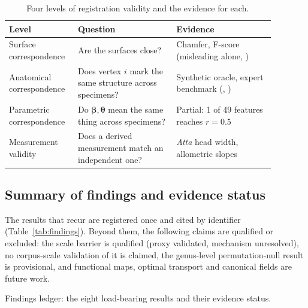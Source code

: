 \begin{table}[!htb]
\centering
\caption{Four levels of registration validity and the evidence for each.}
\label{tab:validity}
\begin{tabular}{@{}L{0.20\linewidth}L{0.34\linewidth}L{0.34\linewidth}@{}}
\toprule
\textbf{Level} & \textbf{Question} & \textbf{Evidence}\\
\midrule
Surface correspondence & Are the surfaces close? & Chamfer, F-score
 (misleading alone, )\\
Anatomical correspondence & Does vertex $i$ mark the same structure across
 specimens? & Synthetic oracle, expert benchmark (, )\\
Parametric correspondence & Do $\bm\beta,\bm\theta$ mean the same thing across
 specimens? & Partial: 1 of 49 features reaches $r=0.5$\\
Measurement validity & Does a derived measurement match an independent one? &
 \emph{Atta} head width, allometric slopes\\
\bottomrule
\end{tabular}
\end{table}

\subsection{Summary of findings and evidence status}
\label{sec:ledger}

The results that recur are registered once and cited by identifier
(Table~\ref{tab:findings}). Beyond them, the following claims are qualified or
excluded: the scale barrier is qualified (proxy validated, mechanism
unresolved), no corpus-scale validation of it is claimed, the genus-level
permutation-null result is provisional, and functional maps, optimal transport
and canonical fields are future work.

\begin{table}[!htb]
\centering
\caption{Findings ledger: the eight load-bearing results and their evidence
status.}
\label{tab:findings}
\printfindingledger
\end{table}
